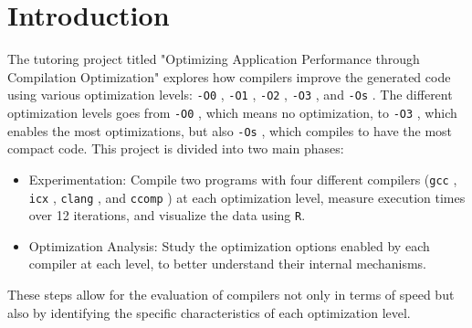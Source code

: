 \documentclass{rapport}
\newcommand{\gcc}{\texttt{gcc} }
\newcommand{\icx}{\texttt{icx} }
\newcommand{\clang}{\texttt{clang} }
\newcommand{\comp}{\texttt{ccomp} }
\newcommand{\optizero}{\texttt{-O0} }
\newcommand{\optione}{\texttt{-O1} }
\newcommand{\optitwo}{\texttt{-O2} }
\newcommand{\optithree}{\texttt{-O3} }
\newcommand{\optisize}{\texttt{-Os} }
\begin{document}
\clearpage

\section*{Introduction}
The tutoring project titled "Optimizing Application Performance through Compilation Optimization" explores how compilers improve the generated code 
using various optimization levels: \optizero, \optione, \optitwo, \optithree, and \optisize. \newline
The different optimization levels goes from \optizero, which means no optimization, to \optithree, which enables the most optimizations, but also \optisize, which
compiles to have the most compact code.\newline
This project is divided into two main phases:
\begin{itemize}
    \item Experimentation: Compile two programs with four different compilers (\gcc, \icx, \clang, and \comp) at each optimization level, 
    measure execution times over 12 iterations, and visualize the data using \texttt{R}.
    \item Optimization Analysis: Study the optimization options enabled by each compiler at each level, to better understand their internal mechanisms.
\end{itemize}
These steps allow for the evaluation of compilers not only in terms of speed but also by identifying the specific characteristics of each optimization level.
\end{document}
